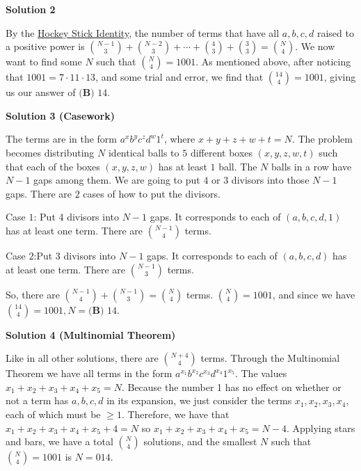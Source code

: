 \begin{enumerate}
 



\textbf{Solution 2}

By the \href{https://artofproblemsolving.com/wiki/index.php?title=Hockey\_Stick\_Identity}{Hockey Stick Identity}, the number of terms that have all $a,b,c,d$ raised to a positive power is $\binom{N-1}{3}+\binom{N-2}{3}+\cdots + \binom{4}{3}+\binom{3}{3}=\binom{N}{4}$. We now want to find some $N$ such that $\binom{N}{4} = 1001$. As mentioned above, after noticing that $1001 = 7\cdot11\cdot13$, and some trial and error, we find that $\binom{14}{4} = 1001$, giving us our answer of $\boxed{\textbf{(B) }14.}$




\textbf{Solution 3 (Casework)}

The terms are in the form $a^xb^yc^zd^w1^t$, where $x + y + z + w + t = N$. The problem becomes distributing $N$ identical balls to $5$ different boxes $(x, y, z, w, t)$ such that each of the boxes $(x, y, z, w)$ has at least $1$ ball. The $N$ balls in a row have $N-1$ gaps among them. We are going to put $4$ or $3$ divisors into those $N-1$ gaps. There are $2$ cases of how to put the divisors.

 Case $1$: Put 4 divisors into $N-1$ gaps. It corresponds to each of $(a, b, c, d, 1)$ has at least one term. There are $\binom{N-1}{4}$ terms.

 Case $2$:Put 3 divisors into $N-1$ gaps. It corresponds to each of $(a, b, c, d)$ has at least one term. There are $\binom{N-1}{3}$ terms.

 So, there are $\binom{N-1}{4}+\binom{N-1}{3}=\binom{N}{4}$ terms. $\binom{N}{4} = 1001$, and since we have $\binom{14}{4} = 1001, N=\boxed{\textbf{(B) }14.}$




\textbf{Solution 4 (Multinomial Theorem)}

Like in all other solutions, there are $\binom{N+4}{4}$ terms. Through the Multinomial Theorem we have all terms in the form $a^{x_1}b^{x_2}c^{x_3}d^{x_4}1^{x_5}$. The values $x_1 + x_2 + x_3 + x_4 + x_5 = N$. Because the number 1 has no effect on whether or not a term has $a, b, c, d$ in its expansion, we just consider the terms $x_1, x_2, x_3, x_4$, each of which must be $\ge 1$. Therefore, we have that $x_1 + x_2 + x_3 + x_4 + x_5 + 4 = N$ so $x_1 + x_2 + x_3 + x_4 + x_5 = N-4$. Applying stars and bars, we have a total $\binom{N}{4}$ solutions, and the smallest $N$ such that $\binom{N}{4} = 1001$ is $N = \boxed{014}$.


\end{enumerate}
